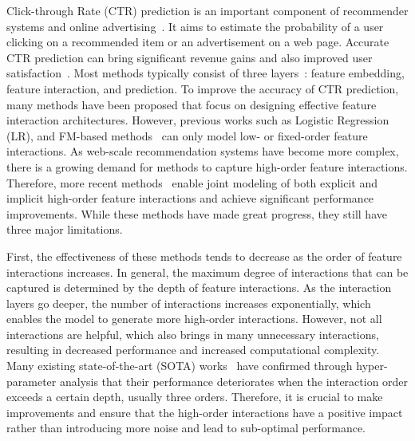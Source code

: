 \documentclass[sigconf]{acmart}
\begin{document}
Click-through Rate (CTR) prediction is an important component of recommender systems and online advertising~\cite{cheng2016wide, covington2016youtobednn}. It aims to estimate the probability of a user clicking on a recommended item or an advertisement on a web page. Accurate CTR prediction can bring significant revenue gains and also improved user satisfaction~\cite{cheng2016wide, wang2021masknet, zhou2019dien}. Most methods typically consist of three layers~\cite{zhang2021deep, zhu2022bars, wang2022enhancing}: feature embedding, feature interaction, and prediction. To improve the accuracy of CTR prediction, many methods have been proposed that focus on designing effective feature interaction architectures. However, previous works such as Logistic Regression (LR)\cite{richardson2007predicting}, and FM-based methods~\cite{rendle2012factorization, blondel2016higher, juan2016field} can only model low- or fixed-order feature interactions. As web-scale recommendation systems have become more complex, there is a growing demand for methods to capture high-order feature interactions. Therefore, more recent methods~\cite{lian2018xdeepfm, wang2021dcnm, wang2017deep, song2019autoint, cheng2020adaptive, yu2020deepim, guo2019oenn} enable joint modeling of both explicit and implicit high-order feature interactions and achieve significant performance improvements. While these methods have made great progress, they still have three major limitations.

First, the effectiveness of these methods tends to decrease as the order of feature interactions increases. In general, the maximum degree of interactions that can be captured is determined by the depth of feature interactions. As the interaction layers go deeper, the number of interactions increases exponentially, which enables the model to generate more high-order interactions. However, not all interactions are helpful, which also brings in many unnecessary interactions, resulting in decreased performance and increased computational complexity. Many existing state-of-the-art (SOTA) works~\cite{covington2016youtobednn, lian2018xdeepfm, cheng2020adaptive, blondel2016higher, song2019autoint, wang2017deep, wang2021dcnm, guo2017deepfm, qu2018product, zhao2021fint, he2017neural, lang2021architecture} have confirmed through hyper-parameter analysis that their performance deteriorates when the interaction order exceeds a certain depth, usually three orders. Therefore, it is crucial to make improvements and ensure that the high-order interactions have a positive impact rather than introducing more noise and lead to sub-optimal performance.
\end{document}
